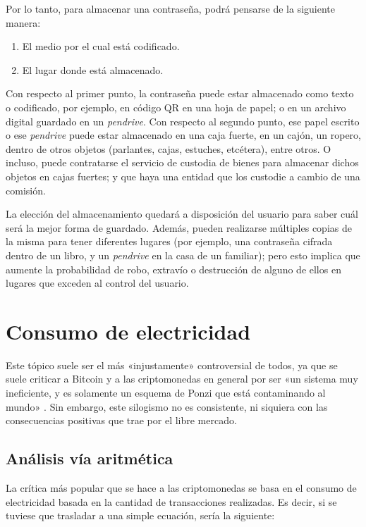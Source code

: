 \documentclass[12pt,a4paper,twoside]{book}
\begin{document}
Por lo tanto, para almacenar una contraseña, podrá pensarse de la siguiente manera:

\begin{enumerate}
\item El medio por el cual está codificado.
\item El lugar donde está almacenado.
\end{enumerate}

Con respecto al primer punto, la contraseña puede estar almacenado como texto o codificado, por ejemplo, en código QR en una hoja de papel; o en un archivo digital guardado en un \textit{pendrive}. Con respecto al segundo punto, ese papel escrito o ese \textit{pendrive} puede estar almacenado en una caja fuerte, en un cajón, un ropero, dentro de otros objetos (parlantes, cajas, estuches, etcétera), entre otros. O incluso, puede contratarse el servicio de custodia de bienes para almacenar dichos objetos en cajas fuertes; y que haya una entidad que los custodie a cambio de una comisión.

La elección del almacenamiento quedará a disposición del usuario para saber cuál será la mejor forma de guardado. Además, pueden realizarse múltiples copias de la misma para tener diferentes lugares (por ejemplo, una contraseña cifrada dentro de un libro, y un \textit{pendrive} en la casa de un familiar); pero esto implica que aumente la probabilidad de robo, extravío o destrucción de alguno de ellos en lugares que exceden al control del usuario.

\section{Consumo de electricidad}
Este tópico suele ser el más «injustamente» controversial de todos, ya que se suele criticar a Bitcoin y a las criptomonedas en general por ser «un sistema muy ineficiente, y es solamente un esquema de Ponzi que está contaminando al mundo» \cite{bitcoin:visa}. Sin embargo, este silogismo no es consistente, ni siquiera con las consecuencias positivas que trae por el libre mercado.

\subsection{Análisis vía aritmética}
La crítica más popular que se hace a las criptomonedas se basa en el consumo de electricidad basada en la cantidad de transacciones realizadas. Es decir, si se tuviese que trasladar a una simple ecuación, sería la siguiente:
\end{document}
